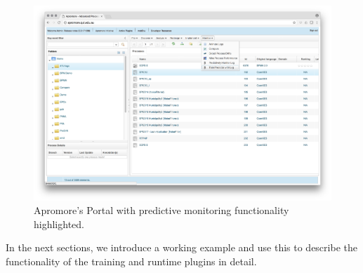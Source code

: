 \begin{figure}[t!]%
	\centering
	\includegraphics[width=\textwidth]{img/apromore-menus}
	\vspace{-2\baselineskip}
	\caption{Apromore's Portal with predictive monitoring functionality highlighted.}
	\label{fig:apromore-menus}
\end{figure}

In the next sections, we introduce a working example and use this to describe the functionality of the training and runtime plugins in detail.

